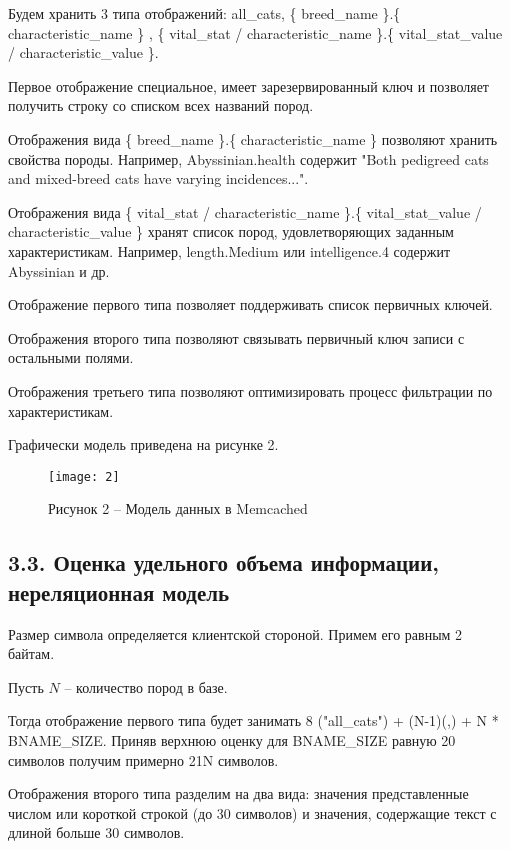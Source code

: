 Будем хранить 3 типа отображений: all\_cats, \{ breed\_name \}.\{ characteristic\_name \}
, \{ vital\_stat / characteristic\_name \}.\{ vital\_stat\_value / characteristic\_value \}.

Первое отображение специальное, имеет зарезервированный ключ и позволяет получить строку со списком всех названий пород.

Отображения вида \{ breed\_name \}.\{ characteristic\_name \} позволяют хранить свойства породы. Например, Abyssinian.health
содержит "Both pedigreed cats and mixed-breed cats have varying incidences...".

Отображения вида \{ vital\_stat / characteristic\_name \}.\{ vital\_stat\_value / characteristic\_value \} хранят список пород,
удовлетворяющих заданным характеристикам. Например, length.Medium или intelligence.4 содержит Abyssinian и др.

Отображение первого типа позволяет поддерживать список первичных ключей.

Отображения второго типа позволяют связывать первичный ключ записи с остальными полями.

Отображения третьего типа позволяют оптимизировать процесс фильтрации по характеристикам.

Графически модель приведена на рисунке 2.
\begin{figure}[H]
    \centering
    \texttt{[image: 2]}
    \caption*{Рисунок 2 -- Модель данных в Memcached}
    \label{fig:2}
\end{figure}

\subsection*{3.3. Оценка удельного объема информации, нереляционная модель}

Размер символа определяется клиентской стороной. Примем его равным 2 байтам.

Пусть $N$ -- количество пород в базе.

Тогда отображение первого типа будет занимать 8 ("all\_cats") + (N-1)(,) + N * BNAME\_SIZE. Приняв верхнюю оценку для
BNAME\_SIZE равную 20 символов получим примерно 21N символов.

Отображения второго типа разделим на два вида: значения представленные числом или короткой строкой (до 30 символов) и
значения, содержащие текст с длиной больше 30 символов.

